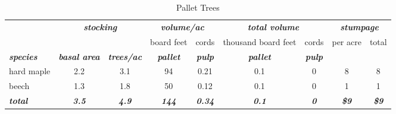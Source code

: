 \documentclass[landscape]{article}
\begin{document}
\begin{table}[H]

\caption{\label{tab:unnamed-chunk-48}Pallet Trees}
\fontsize{10}{12}\selectfont
\begin{tabular}[t]{lcccccccc}
\toprule
\multicolumn{1}{c}{\em{\textbf{ }}} & \multicolumn{2}{c}{\em{\textbf{stocking}}} & \multicolumn{2}{c}{\em{\textbf{volume/ac }}} & \multicolumn{2}{c}{\em{\textbf{total volume}}} & \multicolumn{2}{c}{\em{\textbf{stumpage}}} \\
\cmidrule(l{3pt}r{3pt}){2-3} \cmidrule(l{3pt}r{3pt}){4-5} \cmidrule(l{3pt}r{3pt}){6-7} \cmidrule(l{3pt}r{3pt}){8-9}
\multicolumn{3}{c}{ } & \multicolumn{1}{c}{board feet} & \multicolumn{1}{c}{cords} & \multicolumn{1}{c}{thousand board feet} & \multicolumn{1}{c}{cords} & \multicolumn{1}{c}{per acre} & \multicolumn{1}{c}{total} \\
\cmidrule(l{3pt}r{3pt}){4-4} \cmidrule(l{3pt}r{3pt}){5-5} \cmidrule(l{3pt}r{3pt}){6-6} \cmidrule(l{3pt}r{3pt}){7-7} \cmidrule(l{3pt}r{3pt}){8-8} \cmidrule(l{3pt}r{3pt}){9-9}
\rowcolor[HTML]{DCDCDC}  \em{\textbf{species}} & \em{\textbf{basal area}} & \em{\textbf{trees/ac}} & \em{\textbf{pallet}} & \em{\textbf{pulp}} & \em{\textbf{pallet}} & \em{\textbf{pulp}} & \em{\textbf{ }} & \em{\textbf{ }}\\
\midrule
\rowcolor{gray!6}  hard maple & 2.2 & 3.1 & 94 & 0.21 & 0.1 & 0 & 8 & 8\\
 
beech & 1.3 & 1.8 & 50 & 0.12 & 0.1 & 0 & 1 & 1\\
 
\rowcolor{gray!6}  \rowcolor[HTML]{DCDCDC}  \em{\textbf{total}} & \em{\textbf{3.5}} & \em{\textbf{4.9}} & \em{\textbf{144}} & \em{\textbf{0.34}} & \em{\textbf{0.1}} & \em{\textbf{0}} & \em{\textbf{\$9}} & \em{\textbf{\$9}}\\
\bottomrule
\end{tabular}
\end{table}
\end{document}
